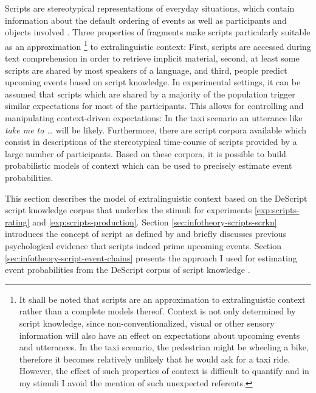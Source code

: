 Scripts \citep{schank.abelson1977} are stereotypical representations of everyday situations, which contain information about the default ordering of events as well as participants and objects involved \citep{bower.etal1979}. Three properties of fragments make scripts particularly suitable as an approximation%
%
\footnote{It shall be noted that scripts are an approximation to extralinguistic context rather than a complete models thereof. Context is not only determined by script knowledge, since non-conventionalized, visual or other sensory information will also have an effect on expectations about upcoming events and utterances. In the taxi scenario, the pedestrian might be wheeling a bike, therefore it becomes relatively unlikely that he would ask for a taxi ride. However, the effect of such properties of context is difficult to quantify and in my stimuli I avoid the mention of such unexpected referents.}\afterfn%
%
to extralinguistic context: First, scripts are accessed during text comprehension in order to retrieve implicit material, second, at least some scripts are shared by most speakers of a language, and third, people predict upcoming events based on script knowledge. In experimental settings, it can be assumed that scripts which are shared by a majority of the population trigger similar expectations for most of the participants. This allows for controlling and manipulating context-driven expectations: In the taxi scenario an utterance like \textit{take me to \dots} will be likely. Furthermore, there are script corpora available which consist in descriptions of the stereotypical time-course of scripts provided by a large number of participants. Based on these corpora, it is possible to build probabilistic models of context which can be used to precisely estimate event probabilities. 

This section describes the model of extralinguistic context based on the DeScript script knowledge corpus \citep{wanzare.etal2016} that underlies the stimuli for experiments \ref{exp:scripts-rating} and \ref{exp:scripts-production}. Section \ref{sec:infotheory-scripts-scrkn} introduces the concept of script as defined by \citet{schank.abelson1977} and briefly discusses previous psychological evidence that scripts indeed prime upcoming events. Section \ref{sec:infotheory-script-event-chains} presents the approach I used for estimating event probabilities from the DeScript corpus of script knowledge \citep{wanzare.etal2016}.

